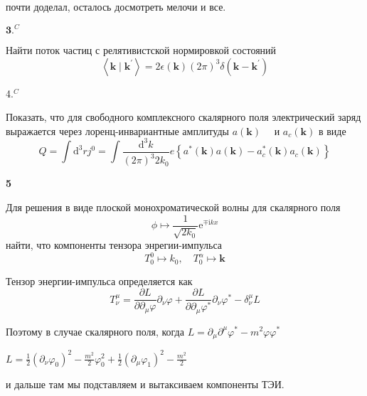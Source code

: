 \documentclass[a4paper,12pt]{article} %
\newcommand{\parder}[2]{\frac{\partial {#1}}{\partial {#2}}} %
\begin{document}
\begin{ttask}
почти доделал, осталось досмотреть мелочи и все.











\end{ttask}



\begin{ttask}$\mathbf{3 .}^{C}$ 

Найти поток частиц с релятивистской нормировкой состояний
$$
\left\langle\boldsymbol{k} \mid \boldsymbol{k}^{\prime}\right\rangle=
2 \epsilon(\boldsymbol{k})(2 \pi)^{3} \delta\left(\boldsymbol{k}-\boldsymbol{k}^{\prime}\right)
$$






\end{ttask}



\begin{ttask} 4.$^{C}$ 
	
Показать, что для свободного комплексного скалярного поля электрический заряд выражается через 
лоренц-инвариантные амплитуды $a(\boldsymbol{k}) \quad$ и $a_{c}(\boldsymbol{k})$ в виде
$$
Q=\int \mathrm{d}^{3} r j^{0}=
\int \frac{\mathrm{d}^{3} k}{(2 \pi)^{3} 2 k_{0}} e\left\{a^{*}(\boldsymbol{k}) a(\boldsymbol{k})-a_{c}^{*}(\boldsymbol{k}) a_{c}(\boldsymbol{k})\right\}
$$





\end{ttask}



\begin{ttask}\textbf{5}

Для решения в виде плоской монохроматической волны для скалярного поля
$$
\phi \mapsto \frac{1}{\sqrt{2 k_{0}}} \mathrm{e}^{\mp \mathrm{i} k x}
$$
найти, что компоненты тензора энрегии-импульса
$$
T_{0}^{0} \mapsto k_{0}, \quad T_{0}^{\alpha} \mapsto \boldsymbol{k}
$$

Тензор энергии-импульса определяется как 
\[ T^\mu_\nu=\parder{L}{\partial_\mu \varphi}\partial_\nu \varphi+
\parder{L}{\partial_\mu \varphi^{*}}\partial_\nu \varphi^{*}-\delta_\nu^\mu L \]

Поэтому в случае скалярного поля, когда $ L=\partial_\mu \partial^\mu \varphi^{*}-m^2\varphi \varphi^{*}$

$ L=\frac{1}{2} (\partial_\nu \varphi_0)^2- \frac{m^2}{2}\varphi_0^2+\frac{1}{2}(\partial_\mu\varphi_1)^2-\frac{m^2}{2} $


и дальше там мы подставляем и вытаксиваем компоненты ТЭИ.






\end{ttask}
\end{document}
